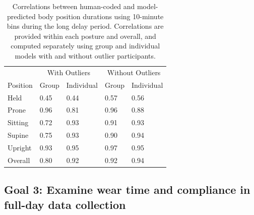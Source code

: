 \documentclass[
  man]{apa6}
\begin{document}
\begin{table}[tbp]

\begin{center}
\begin{threeparttable}

\caption{\label{tab:pt2binstable}Correlations between human-coded and model-predicted body position durations using 10-minute bins during the long delay period. Correlations are provided within each posture and overall, and computed separately using group and individual models with and without outlier participants.}

\begin{tabular}{lllll}
\toprule
 & \multicolumn{2}{c}{With Outliers} & \multicolumn{2}{c}{Without Outliers} \\
\cmidrule(r){2-3} \cmidrule(r){4-5}
Position & Group & Individual & Group & Individual\\
\midrule
Held & 0.45 & 0.44 & 0.57 & 0.56\\
Prone & 0.96 & 0.81 & 0.96 & 0.88\\
Sitting & 0.72 & 0.93 & 0.91 & 0.93\\
Supine & 0.75 & 0.93 & 0.90 & 0.94\\
Upright & 0.93 & 0.95 & 0.97 & 0.95\\ \midrule
Overall & 0.80 & 0.92 & 0.92 & 0.94\\
\bottomrule
\end{tabular}

\end{threeparttable}
\end{center}

\end{table}

\hypertarget{goal-3-examine-wear-time-and-compliance-in-full-day-data-collection}{%
\subsection{Goal 3: Examine wear time and compliance in full-day data collection}\label{goal-3-examine-wear-time-and-compliance-in-full-day-data-collection}}
\end{document}
